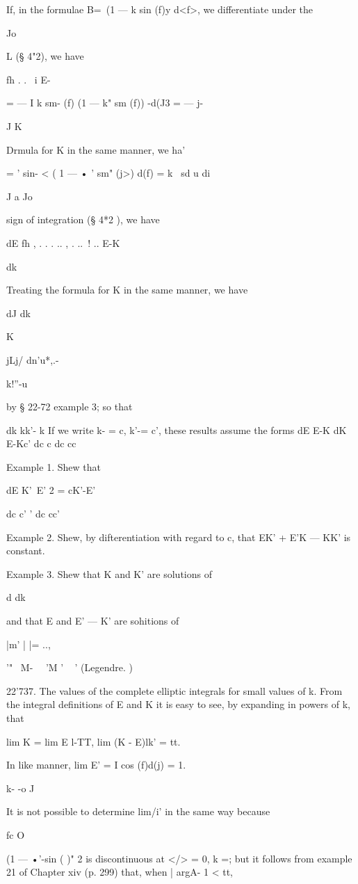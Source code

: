 If, in the formulae B=\ (1 — k sin (f)y d<f>, we differentiate under
the

Jo

L (§ 4"2), we have

fh . . \ i E-

= — I k sm- (f) (1 — k" sm (f)) -d(J3 = — j-

J K

Drmula for K in the same manner, we ha'

= ' sin- < ( 1 — • ' sm" (j>) d(f) = k \ sd u di

J a Jo

sign of integration (§ 4*2 ), we have

dE fh , . . . .. , . ..\ ! .. E-K

dk

Treating the formula for K in the same manner, we have

dJ dk

K

jLj/ dn'u*,.-

k!''-u

by § 22-72 example 3; so that

dk kk'- k If we write k- = c, k'-= c', these results assume the forms
dE E-K dK E-Kc' dc c dc cc

Example 1. Shew that

 dE K'~E' 2 = cK'-E'

dc c' ' dc cc'

Example 2. Shew, by difterentiation with regard to c, that EK' + E'K —
KK' is constant.

Example 3. Shew that K and K' are solutions of

d dk

and that E and E' — K' are sohitions of

|m' | |= ..,

 '" ~M- \ \ 'M ' ~ ' (Legendre. )

22'737. The values of the complete elliptic integrals for small values
of k. From the integral definitions of E and K it is easy to see, by
expanding in powers of k, that

lim K = lim E l-TT, lim (K - E)lk' = tt.

In like manner, lim E' = I cos (f)d(j) = 1.

k- -o J

It is not possible to determine lim/i' in the same way because

fc O

(1 — •'-sin ( )" 2 is discontinuous at </> = 0, k =; but it follows
from example 21 of Chapter xiv (p. 299) that, when | argA- 1 < tt,

